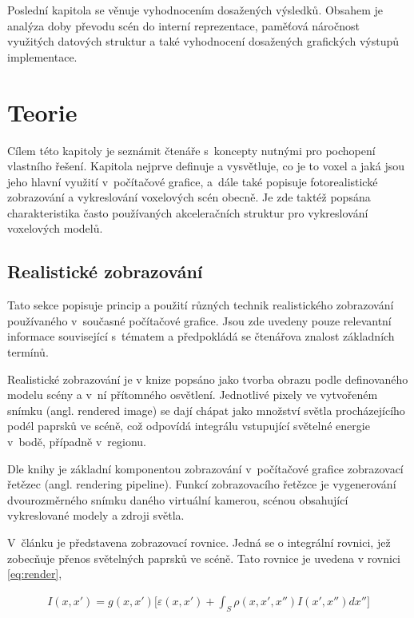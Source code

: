Poslední kapitola se věnuje vyhodnocením dosažených výsledků. Obsahem je analýza doby převodu scén do interní reprezentace, paměťová náročnost využitých datových struktur a také vyhodnocení dosažených grafických výstupů implementace.

\chapter{Teorie}
\label{teorie}
Cílem této kapitoly je seznámit čtenáře s~koncepty nutnými pro pochopení vlastního řešení. Kapitola nejprve definuje a vysvětluje, co je to voxel a jaká jsou jeho hlavní využití v~počítačové grafice, a~dále také popisuje fotorealistické zobrazování a vykreslování voxelových scén obecně. Je zde taktéž popsána charakteristika často používaných akceleračních struktur pro vykreslování voxelových modelů.

\section{Realistické zobrazování}
Tato sekce popisuje princip a použití různých technik realistického zobrazování používaného v~současné počítačové grafice. Jsou zde uvedeny pouze relevantní informace související s~tématem a předpokládá se čtenářova znalost základních termínů.

Realistické zobrazování je v knize \cite{gfx_principles_practice} popsáno jako tvorba obrazu podle definovaného modelu scény a v~ní přítomného osvětlení. Jednotlivé pixely ve vytvořeném snímku (angl. rendered image) se dají chápat jako množství světla procházejícího podél paprsků ve scéně, což odpovídá integrálu vstupující světelné energie v~bodě, případně v~regionu.

Dle knihy \cite{real_time_render} je základní komponentou zobrazování v~počítačové grafice zobrazovací řetězec (angl. rendering pipeline). Funkcí zobrazovacího řetězce je vygenerování dvourozměrného snímku daného virtuální kamerou, scénou obsahující vykreslované modely a zdroji světla.

V~článku \cite{render_eq} je představena zobrazovací rovnice. Jedná se o integrální rovnici, jež zobecňuje přenos světelných paprsků ve scéně. Tato rovnice je uvedena v rovnici \ref{eq:render},

\begin{equation} \label{eq:render}
	\begin{gathered}
		I(x, x') = g(x, x') \Big[\varepsilon(x, x') + \int_S\rho(x, x', x'')I(x', x'')dx''\Big]
	\end{gathered}
\end{equation}

